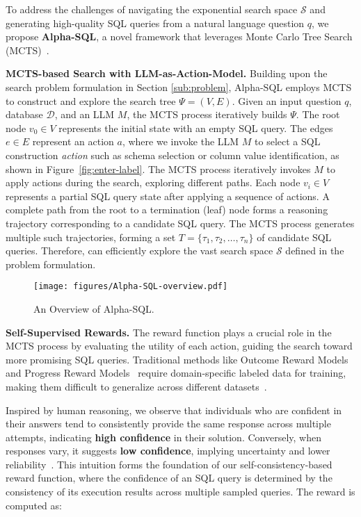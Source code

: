 To address the challenges of navigating the exponential search space $\mathcal{S}$ and generating high-quality SQL queries from a natural language question $q$, we propose \textbf{Alpha-SQL}, a novel framework that leverages Monte Carlo Tree Search (MCTS)~\cite{mcts}. 



\textbf{MCTS-based Search with LLM-as-Action-Model.}
Building upon the search problem formulation in Section \ref{sub:problem}, Alpha-SQL employs MCTS to construct and explore the search tree $\Psi = (V, E)$. Given an input question $q$, database $\mathcal{D}$, and an LLM $M$, the MCTS process iteratively builds $\Psi$. The root node $v_0 \in V$ represents the initial state with an empty SQL query. The edges $e \in E$ represent an action $a$, where we invoke the LLM $M$ to select a SQL construction \textit{action} such as schema selection or column value identification, as shown in Figure~\ref{fig:enter-label}. The MCTS process iteratively invokes $M$ to apply actions during the search, exploring different paths. Each node $v_i \in V$ represents a partial SQL query state after applying a sequence of actions. %
A complete path from the root to a termination (leaf) node forms a reasoning trajectory corresponding to a candidate SQL query. The MCTS process generates multiple such trajectories, forming a set $T = \{\tau_1, \tau_2, \dots, \tau_n\}$ of candidate SQL queries. Therefore, \sys can efficiently explore the vast search space $\mathcal{S}$ defined in the problem formulation.

\begin{figure*}[t!]
    \centering    \texttt{[image: figures/Alpha-SQL-overview.pdf]}
    \vspace{-2em}
    \caption{An Overview of Alpha-SQL.}
    \label{fig:overview}
    \vspace{-1em}
\end{figure*}
	
\textbf{Self-Supervised Rewards.}
The reward function plays a crucial role in the MCTS process by evaluating the utility of each action, guiding the search toward more promising SQL queries. Traditional methods like Outcome Reward Models~\cite{DBLP:conf/nips/ZelikmanWMG22} and Progress Reward Models~\cite{DBLP:journals/corr/abs-2211-14275} require domain-specific labeled data for training, making them difficult to generalize across different datasets~\cite{DBLP:journals/corr/abs-2406-03816}.

Inspired by human reasoning, we observe that individuals who are confident in their answers tend to consistently provide the same response across multiple attempts, indicating \textbf{high confidence} in their solution. Conversely, when responses vary, it suggests \textbf{low confidence}, implying uncertainty and lower reliability~\cite{rStar}. This intuition forms the foundation of our self-consistency-based reward function, where the confidence of an SQL query is determined by the consistency of its execution results across multiple sampled queries. 
The reward is computed as:


